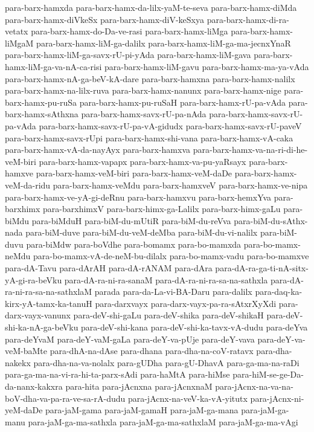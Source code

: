 {para-barx-hamxda
para-barx-hamx-da-lilx-yaM-te-seva
para-barx-hamx-diMda
para-barx-hamx-diVkeSx
para-barx-hamx-diV-keSxya
para-barx-hamx-di-ra-vetatx
para-barx-hamx-do-Da-ve-rasi
para-barx-hamx-liMga
para-barx-hamx-liMgaM
para-barx-hamx-liM-ga-dalilx
para-barx-hamx-liM-ga-ma-jecnxYnaR
para-barx-hamx-liM-ga-savx-rU-pi-yAda
para-barx-hamx-liM-gava
para-barx-hamx-liM-ga-va-nA-ca-risi
para-barx-hamx-liM-gavu
para-barx-hamx-ma-ya-vAda
para-barx-hamx-nA-ga-beV-kA-dare
para-barx-hamxna
para-barx-hamx-nalilx
para-barx-hamx-na-lilx-ruva
para-barx-hamx-nanunx
para-barx-hamx-nige
para-barx-hamx-pu-ruSa
para-barx-hamx-pu-ruSaH
para-barx-hamx-rU-pa-vAda
para-barx-hamx-sAthxna
para-barx-hamx-savx-rU-pa-nAda
para-barx-hamx-savx-rU-pa-vAda
para-barx-hamx-savx-rU-pa-vA-gidudx
para-barx-hamx-savx-rU-paveV
para-barx-hamx-savx-rUpi
para-barx-hamx-shi-vana
para-barx-hamx-vA-caka
para-barx-hamx-vA-da-nayAyx
para-barx-hamxva
para-barx-hamx-va-na-ri-di-he-veM-biri
para-barx-hamx-vapapx
para-barx-hamx-va-pu-yaRsayx
para-barx-hamxve
para-barx-hamx-veM-biri
para-barx-hamx-veM-daDe
para-barx-hamx-veM-da-ridu
para-barx-hamx-veMdu
para-barx-hamxveV
para-barx-hamx-ve-nipa
para-barx-hamx-ve-yA-gi-deRnu
para-barx-hamxvu
para-barx-hemxYva
para-barxhimx
para-barxhimxV
para-barx-himx-ga-Lalilx
para-barx-himx-gaLu
para-biMdu
para-biMduH
para-biM-du-mUtiR
para-biM-du-reVva
para-biM-du-sAthx-nada
para-biM-duve
para-biM-du-veM-deMba
para-biM-du-vi-nalilx
para-biM-duvu
para-biMdw
para-boVdhe
para-bomamx
para-bo-mamxda
para-bo-mamx-neMdu
para-bo-mamx-vA-de-neM-bu-dilalx
para-bo-mamx-vadu
para-bo-mamxve
para-dA-Tavu
para-dArAH
para-dA-rANAM
para-dAra
para-dA-ra-ga-ti-nA-sitx-yA-gi-ra-beVku
para-dA-ra-ni-ra-sanaM
para-dA-ra-ni-ra-sa-na-sathxla
para-dA-ra-ni-ra-sa-na-sathxlaM
parada
para-da-La-vi-BA-Daru
para-dalilx
para-daq-ka-kirx-yA-tamx-ka-tanuH
para-darxvayx
para-darx-vayx-pa-ra-sAtxrXyXdi
para-darx-vayx-vanunx
para-deV-shi-gaLu
para-deV-shika
para-deV-shikaH
para-deV-shi-ka-nA-ga-beVku
para-deV-shi-kana
para-deV-shi-ka-tavx-vA-dudu
para-deYva
para-deYvaM
para-deY-vaM-gaLa
para-deY-va-pUje
para-deY-vava
para-deY-va-veM-baMte
para-dhA-na-dAse
para-dhana
para-dha-na-coV-ratavx
para-dha-nakekx
para-dha-na-va-nolalx
para-gUDha
para-gU-DhavA
para-ga-ma-na-raDi
para-ga-ma-na-vi-ra-hi-ta-parx-sAdi
para-haMtA
para-hiMse
para-hiM-se-ge-Da-da-nanx-kakxra
para-hita
para-jAcnxna
para-jAcnxnaM
para-jAcnx-na-va-na-boV-dha-va-pa-ra-ve-sa-rA-dudu
para-jAcnx-na-veV-ka-vA-yitutx
para-jAcnx-ni-yeM-daDe
para-jaM-gama
para-jaM-gamaH
para-jaM-ga-mana
para-jaM-ga-manu
para-jaM-ga-ma-sathxla
para-jaM-ga-ma-sathxlaM
para-jaM-ga-ma-vAgi
}
